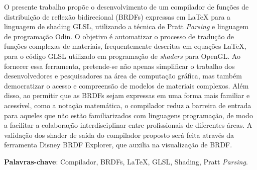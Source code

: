 \setlength{\absparsep}{18pt} %
\begin{resumo}
 


  O presente trabalho propõe o desenvolvimento de um compilador de funções de distribuição de reflexão bidirecional (BRDFs) expressas em LaTeX para a linguagem de shading GLSL, utilizando a técnica de Pratt \textit{Parsing} e linguagem de programação Odin. O objetivo é automatizar o processo de tradução de funções complexas de materiais, frequentemente descritas em equações LaTeX, para o código GLSL utilizado em programação de \textit{shaders} para OpenGL. Ao fornecer essa ferramenta, pretende-se não apenas simplificar o trabalho dos desenvolvedores e pesquisadores na área de computação gráfica, mas também democratizar o acesso e compreensão de modelos de materiais complexos. Além disso, ao permitir que as BRDFs sejam expressas em uma forma mais familiar e acessível, como a notação matemática, o compilador reduz a barreira de entrada para aqueles que não estão familiarizados com linguagens programação, de modo a facilitar a colaboração interdisciplinar entre profissionais de diferentes áreas. A validação dos shader de saída do compilador proposto será feita através da ferramenta Disney BRDF Explorer, que auxilia na visualização de BRDF. 

  \textbf{Palavras-chave}: Compilador, BRDFs, LaTeX, GLSL, Shading, Pratt \textit{Parsing}.
\end{resumo}
